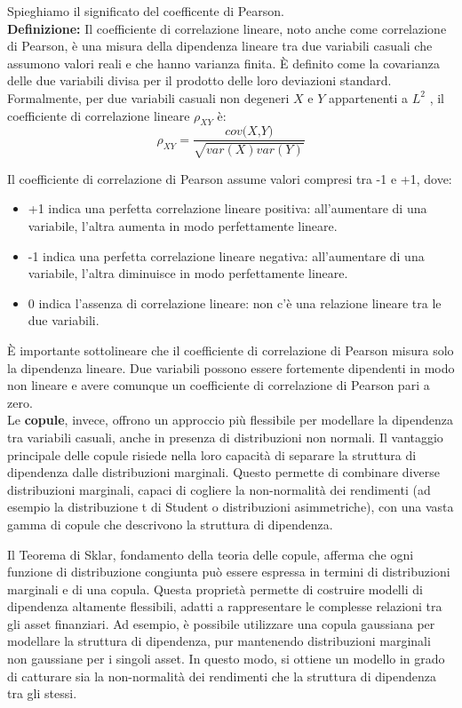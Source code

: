 \documentclass[a4paper,12pt]{article}
\begin{document}
\noindent Spieghiamo il significato del coefficente di Pearson.\\

\noindent \textbf{Definizione:} Il coefficiente di correlazione lineare, noto anche come correlazione di Pearson, è una misura della dipendenza lineare tra due variabili casuali che assumono valori reali e che hanno varianza finita. È definito come la covarianza delle due variabili divisa per il prodotto delle loro deviazioni standard.
Formalmente, per due variabili casuali non degeneri $X$ e $Y$ appartenenti a $L^2$ , il coefficiente di correlazione lineare $\rho_{XY}$ è:\\
\[
\rho_{XY} = \frac{\textit{cov(X,Y)}}{\sqrt{var(X)var(Y)}}
\]

\noindent Il coefficiente di correlazione di Pearson assume valori compresi tra -1 e +1, dove:
\begin{itemize}
	\item +1 indica una perfetta correlazione lineare positiva: all'aumentare di una variabile, l'altra aumenta in modo perfettamente lineare.
	\item -1 indica una perfetta correlazione lineare negativa: all'aumentare di una variabile, l'altra diminuisce in modo perfettamente lineare.
	\item 0 indica l'assenza di correlazione lineare: non c'è una relazione lineare tra le due variabili.\\
\end{itemize}

\noindent È importante sottolineare che il coefficiente di correlazione di Pearson misura solo la dipendenza lineare. Due variabili possono essere fortemente dipendenti in modo non lineare e avere comunque un coefficiente di correlazione di Pearson pari a zero.\\

\noindent Le \textbf{copule}, invece, offrono un approccio più flessibile per modellare la dipendenza tra variabili casuali, anche in presenza di distribuzioni non normali. Il vantaggio principale delle copule risiede nella loro capacità di separare la struttura di dipendenza dalle distribuzioni marginali. Questo permette di combinare diverse distribuzioni marginali, capaci di cogliere la non-normalità dei rendimenti (ad esempio la distribuzione t di Student o distribuzioni asimmetriche), con una vasta gamma di copule che descrivono la struttura di dipendenza. 

\noindent Il Teorema di Sklar, fondamento della teoria delle copule, afferma che ogni funzione di distribuzione congiunta può essere espressa in termini di distribuzioni marginali e di una copula. Questa proprietà permette di costruire modelli di dipendenza altamente flessibili, adatti a rappresentare le complesse relazioni tra gli asset finanziari. Ad esempio, è possibile utilizzare una copula gaussiana per modellare la struttura di dipendenza, pur mantenendo distribuzioni marginali non gaussiane per i singoli asset. In questo modo, si ottiene un modello in grado di catturare sia la non-normalità dei rendimenti che la struttura di dipendenza tra gli stessi.
\end{document}
